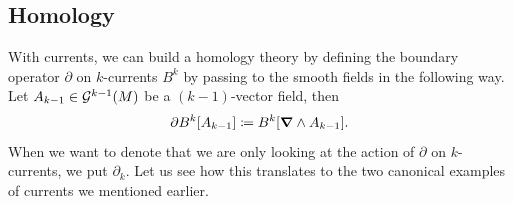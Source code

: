 \documentclass{article}
\begin{document}
\subsection{Homology}
\label{subsec:homology}
With currents, we can build a homology theory \cite{iversen_cauchy_1989,lekhyananda_homology_nodate, giaquinta_cartesian_1998} by defining the boundary operator $\partial$ on $k$-currents $B^k$ by passing to the smooth fields in the following way. Let $A_{k-1}\in \mathcal{G}^{k-1}(M)$ be a $(k-1)$-vector field, then
\begin{equation}
\partial B^{k}[A_{k-1}] \coloneqq B^{k}[\boldsymbol{\nabla} \wedge A_{k-1}].
\end{equation}
When we want to denote that we are only looking at the action of $\partial$ on $k$-currents, we put $\partial_k$.
Let us see how this translates to the two canonical examples of currents we mentioned earlier. 
\end{document}
